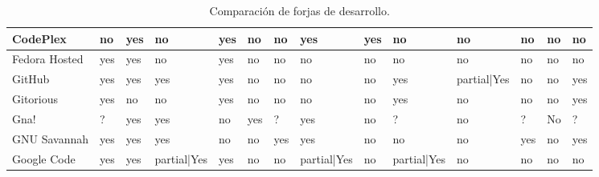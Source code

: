 \begin{landscape}
\begin{table}[H]
{\begin{tabular}{|l|l|l|l|l|l|l|l|l|l|l|l|l|l|}
            \hline CodePlex & no \cellcolor{red} & yes \cellcolor{green} & no \cellcolor{red} & yes \cellcolor{green} & no \cellcolor{red} & no \cellcolor{red} & yes \cellcolor{green} & yes \cellcolor{green} & no \cellcolor{red} & no \cellcolor{red} & no \cellcolor{red} & no \cellcolor{red} & no \cellcolor{red}\\

            \hline Fedora Hosted & yes \cellcolor{green} & yes \cellcolor{green} & no \cellcolor{red} & yes \cellcolor{green} & no \cellcolor{red} & no \cellcolor{red} & no \cellcolor{red} & no \cellcolor{red} & no \cellcolor{red} & no \cellcolor{red} & no \cellcolor{red} & no \cellcolor{red} & no \cellcolor{red}\\

            \hline GitHub & yes \cellcolor{green} & yes \cellcolor{green} & yes \cellcolor{green} & yes \cellcolor{green} & no \cellcolor{red} & no \cellcolor{red} & no \cellcolor{red} & no \cellcolor{red} & yes \cellcolor{green} & partial|Yes \cellcolor{yellow} & no \cellcolor{red} & no \cellcolor{red} & yes \cellcolor{green}\\

            \hline Gitorious & yes \cellcolor{green} & no \cellcolor{red} & no \cellcolor{red} & yes \cellcolor{green} & no \cellcolor{red} & no \cellcolor{red} & no \cellcolor{red} & no \cellcolor{red} & yes \cellcolor{green} & no \cellcolor{red} & no \cellcolor{red} & no \cellcolor{red} & yes \cellcolor{green}\\

            \hline Gna! & ?& yes \cellcolor{green}& yes \cellcolor{green} & no \cellcolor{red} & yes \cellcolor{green}& ?& yes \cellcolor{green}& no \cellcolor{red}& ?& no \cellcolor{red}& ?& No& ?\\ 

            \hline GNU Savannah & yes \cellcolor{green} & yes \cellcolor{green} & yes \cellcolor{green} & no \cellcolor{red} & no \cellcolor{red} & yes \cellcolor{green} & yes \cellcolor{green} & no \cellcolor{red} & no \cellcolor{red} & no \cellcolor{red} & yes \cellcolor{green} & no \cellcolor{red} & yes \cellcolor{green}\\

            \hline Google Code & yes \cellcolor{green} & yes \cellcolor{green} & partial|Yes \cellcolor{yellow} & yes \cellcolor{green} & no \cellcolor{red} & no \cellcolor{red} & partial|Yes \cellcolor{yellow} & no \cellcolor{red} & partial|Yes \cellcolor{yellow} & no \cellcolor{red} & no \cellcolor{red} & no \cellcolor{red} & no \cellcolor{red}\\

            \hline
        \end{tabular}
    }
    \caption{Comparación de forjas de desarrollo.}
    \label{tabla_compartiva}

    \end{table}
\end{landscape}

